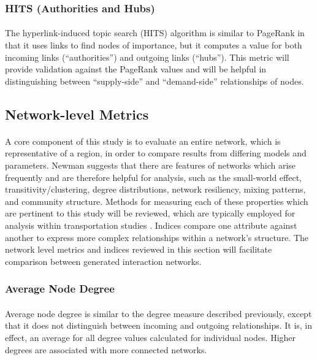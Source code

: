 \documentclass[12pt,a4paper]{thesis}
\begin{document}
\subsubsection{HITS (Authorities and Hubs)}
\paragraph{}
The hyperlink-induced topic search (HITS) algorithm \citetext{\citealp{Kle99}; \citealp{PageRank}} is similar to PageRank in that it uses links to find nodes of importance, but it computes a value for both incoming links (``authorities'') and outgoing links (``hubs''). This metric will provide validation against the PageRank values and will be helpful in distinguishing between ``supply-side'' and ``demand-side'' relationships of nodes.

\subsection{Network-level Metrics}
\paragraph{}
A core component of this study is to evaluate an entire network, which is representative of a region, in order to compare results from differing models and parameters. Newman \citeyearpar{New03} suggests that there are features of networks which arise frequently and are therefore helpful for analysis, such as the small-world effect, transitivity/clustering, degree distributions, network resiliency, mixing patterns, and community structure. Methods for measuring each of these properties which are pertinent to this study will be reviewed, which are typically employed for analysis within transportation studies \citep{RodComSla06}. Indices compare one attribute against another to express more complex relationships within a network's structure. The network level metrics and indices reviewed in this section will facilitate comparison between generated interaction networks.


\subsubsection{Average Node Degree}
\paragraph{}
Average node degree is similar to the degree measure described previously, except that it does not distinguish between incoming and outgoing relationships. It is, in effect, an average for all degree values calculated for individual nodes. Higher degrees are associated with more connected networks.  
\end{document}
